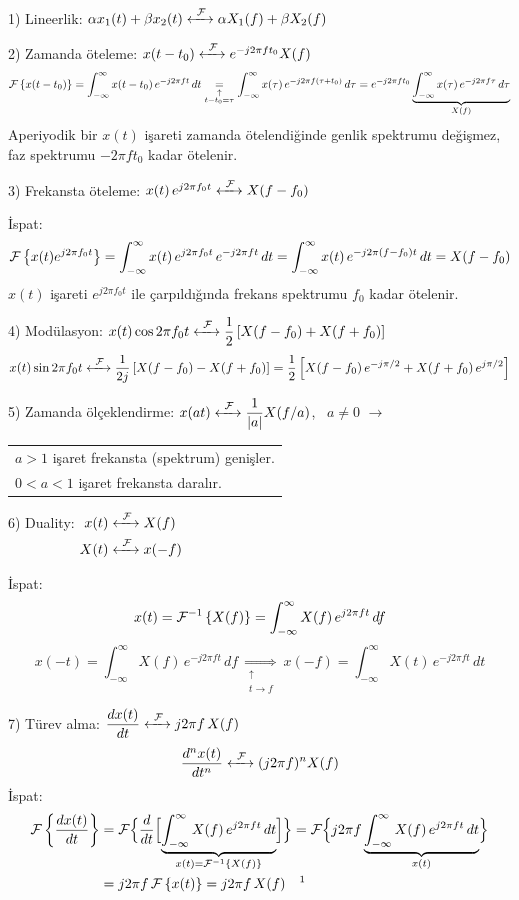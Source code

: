 \documentclass[11pt,a4paper]{article}
\begin{document}
1) Lineerlik: \quad $\alpha x_1(t)+\beta x_2(t) \xleftrightarrow{\ \mathcal{F}\ } \alpha X_1(f)+\beta X_2(f)$

2) Zamanda öteleme: \quad $x(t-t_0) \xleftrightarrow{\ \mathcal{F}\ } e^{-j2\pi ft_0}X(f)$
\[ \mathcal{F}\left\{x(t-t_0)\right\}=\int_{-\infty}^{\infty} x(t-t_0)\,e^{-j2\pi ft}\,dt\underset{\substack{\uparrow\\ t-t_0=\tau}}{=}\int_{-\infty}^{\infty} x(\tau)\,e^{-j2\pi f(\tau+t_0)}\,d\tau=e^{-j2\pi ft_0}\underbrace{\int_{-\infty}^{\infty} x(\tau)\,e^{-j2\pi f\tau}\,d\tau}_{X(f)} \]
Aperiyodik bir $x(t)$ işareti zamanda ötelendiğinde genlik spektrumu değişmez, faz spektrumu $-2\pi ft_0$ kadar ötelenir.

3) Frekansta öteleme: \quad $x(t)\,e^{j2\pi f_0t} \xleftrightarrow{\ \mathcal{F}\ } X(f-f_0)$

İspat:
\[ \mathcal{F}\left\{x(t)e^{j2\pi f_0t}\right\}=\int_{-\infty}^{\infty} x(t)\,e^{j2\pi f_0t}\,e^{-j2\pi ft}\,dt=\int_{-\infty}^{\infty} x(t)\,e^{-j2\pi(f-f_0)t}\,dt=X(f-f_0) \]
$x(t)$ işareti $e^{j2\pi f_0t}$ ile çarpıldığında frekans spektrumu $f_0$ kadar ötelenir.

4) Modülasyon: \quad $x(t)\cos 2\pi f_0t \xleftrightarrow{\ \mathcal{F}\ } \dfrac{1}{2}\left[X(f-f_0)+X(f+f_0)\right]$
\[ x(t)\sin 2\pi f_0t \xleftrightarrow{\ \mathcal{F}\ } \frac{1}{2j}\left[X(f-f_0)-X(f+f_0)\right]=\frac{1}{2}\left[X(f-f_0)\,e^{-j\pi/2}+X(f+f_0)\,e^{j\pi/2}\right] \]

5) Zamanda ölçeklendirme: \quad $x(at) \xleftrightarrow{\ \mathcal{F}\ } \dfrac{1}{|a|}X(f/a)$, \ $a\neq0$
\quad $\longrightarrow$ \begin{tabular}[t]{@{}l@{}} $a>1$ işaret frekansta (spektrum) genişler.\\ $0<a<1$ işaret frekansta daralır.\end{tabular}

6) Duality: \quad $\begin{aligned}[t] x(t) &\xleftrightarrow{\ \mathcal{F}\ } X(f)\\ X(t) &\xleftrightarrow{\ \mathcal{F}\ } x(-f)\end{aligned}$

İspat:
\[ x(t)=\mathcal{F}^{-1}\left\{X(f)\right\}=\int_{-\infty}^{\infty} X(f)\,e^{j2\pi ft}\,df \]
\[ x(-t)=\int_{-\infty}^{\infty} X(f)\,e^{-j2\pi ft}\,df\ \underset{\substack{\uparrow\\ t\to f}}{\Rightarrow}\ x(-f)=\int_{-\infty}^{\infty} X(t)\,e^{-j2\pi ft}\,dt \]

7) Türev alma: \quad $\dfrac{dx(t)}{dt} \xleftrightarrow{\ \mathcal{F}\ } j2\pi f\,X(f)$
\[ \frac{d^nx(t)}{dt^n} \xleftrightarrow{\ \mathcal{F}\ } (j2\pi f)^n X(f) \]
İspat:
\begin{align*}
\Fou{\frac{dx(t)}{dt}} &= \mathcal{F}\Bigl\{\frac{d}{dt}\Bigl[\underbrace{\int_{-\infty}^{\infty} X(f)\,e^{j2\pi ft}\,dt}_{x(t)=\iFou{X(f)}}\Bigr]\Bigr\}
=\mathcal{F}\Bigl\{j2\pi f\underbrace{\int_{-\infty}^{\infty} X(f)\,e^{j2\pi ft}\,dt}_{x(t)}\Bigr\}\\
&= j2\pi f\,\Fou{x(t)}=j2\pi f\,X(f)\quad\text{\footnotemark}
\end{align*}
\end{document}
